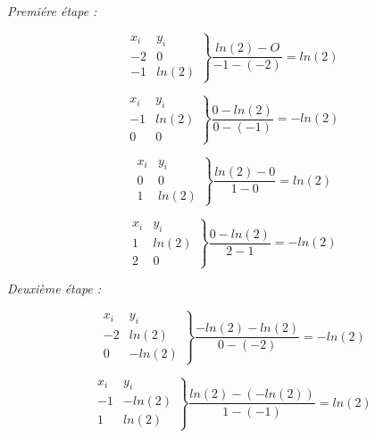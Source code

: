 \documentclass[12pt, letterpaper]{article}
\begin{document}
\begin{enumerate}
  \textit{Premiére étape :}

  \begin{equation*}
    \left.
    \begin{array}{ll}
      x_i & y_i \\
      -2 & 0 \\
      -1 & ln(2)
    \end{array}
    \right\}
    \frac{ln(2) - O}{-1 - (-2)} = ln(2)
  \end{equation*}

  \begin{equation*}
    \left.
    \begin{array}{ll}
      x_i & y_i \\
      -1 & ln(2) \\
      0 & 0
    \end{array}
    \right\}
    \frac{0 - ln(2)}{0 - (-1)} = - ln(2)
  \end{equation*}

  \begin{equation*}
    \left.
    \begin{array}{ll}
      x_i & y_i \\
      0 & 0 \\
      1 & ln(2)
    \end{array}
    \right\}
    \frac{ln(2) - 0}{1 - 0} = ln(2)
  \end{equation*}

  \begin{equation*}
    \left.
    \begin{array}{ll}
      x_i & y_i \\
      1 & ln(2) \\
      2 & 0
    \end{array}
    \right\}
    \frac{0 - ln(2)}{2 - 1} = - ln(2)
  \end{equation*}

  \textit{Deuxième étape :}

  \begin{equation*}
    \left.
    \begin{array}{ll}
      x_i & y_i \\
      -2 & ln(2) \\
      0 & - ln(2)
    \end{array}
    \right\}
    \frac{- ln(2) - ln(2)}{0 - (-2)} = - ln(2)
  \end{equation*}
  
  \begin{equation*}
    \left.
    \begin{array}{ll}
      x_i & y_i \\
      -1 & - ln(2) \\
      1 & ln(2)
    \end{array}
    \right\}
    \frac{ln(2) - (-ln(2))}{1 - (-1)} = ln(2)
  \end{equation*}


\end{enumerate}
\end{document}
